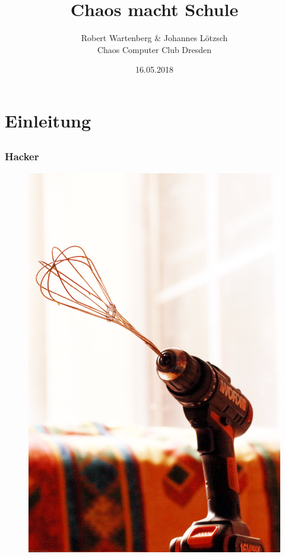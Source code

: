 \documentclass[12pt]{beamer}
\title{Chaos macht Schule}
\author{\small Robert Wartenberg \& Johannes Lötzsch\\\large Chaos Computer Club Dresden}
\date{16.05.2018}
\begin{document}
\maketitle

\section{Einleitung}
\subsection{}


\begin{frame}
  \frametitle{Hacker}
  \begin{figure}
    \includegraphics[height=0.7\textheight]{img/schneeschrauber.jpg}
  \end{figure}
\end{frame}
\end{document}

